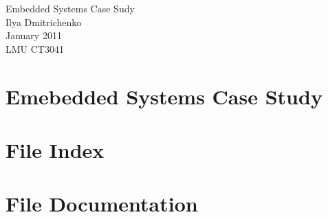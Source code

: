 \documentclass[a4paper]{book}
\begin{document}
\begin{titlepage}
\vspace*{7cm}
\begin{center}
{\Large Embedded Systems Case Sudy }\\

\vspace*{1cm}
{\large Ilya Dmitrichenko}\\

\vspace*{0.5cm}
{\small January 2011}\\

\vspace*{0.7cm}
{\small LMU CT3041}\\

\end{center}
\end{titlepage}
{}
\tableofcontents
{}
\chapter{Emebedded Systems Case Study}
\label{index}
\chapter{File Index}

\chapter{File Documentation}










\printindex
\end{document}
